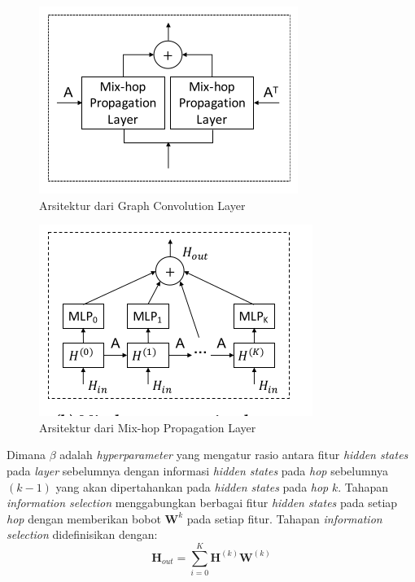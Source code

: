 \begin{figure}[H]
    \centering
    \includegraphics[]{figures/gc_layer.png}
    \caption{Arsitektur dari Graph Convolution Layer}
    \label{fig:gc-layer}
\end{figure}



\begin{figure}[H]
    \centering
    \includegraphics[]{figures/mix_hop.png}
    \caption{Arsitektur dari Mix-hop Propagation Layer}
    \label{fig:mixhop-layer}
\end{figure}


Dimana $\beta$ adalah \textit{hyperparameter} yang mengatur rasio antara fitur \textit{hidden states}  pada \textit{layer} sebelumnya dengan informasi \textit{hidden states} pada \textit{hop} sebelumnya $(k-1)$ yang akan dipertahankan pada \textit{hidden states} pada \textit{hop} $k$. Tahapan \textit{information selection} menggabungkan berbagai fitur \textit{hidden states} pada setiap \textit{hop} dengan memberikan bobot $\mathbf{W}^{k}$ pada setiap fitur. Tahapan \textit{information selection} didefinisikan dengan:
\begin{equation}
    \mathbf{H}_{out} = \sum_{i=0}^{K}\mathbf{H}^{(k)}\mathbf{W}^{(k)}
\end{equation}

